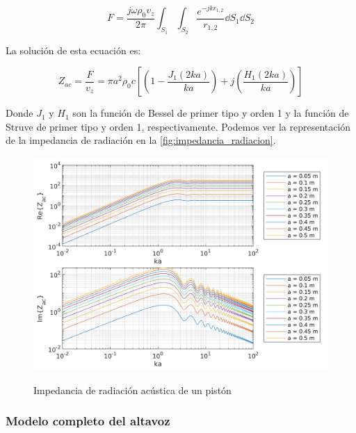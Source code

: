 \documentclass[12pt, a4paper]{article}
\begin{document}
\begin{equation} \label{eq:presion_de_2_sobre_1}
  F = \frac{j\omega \rho_0 v_z}{2\pi} \int_{S_1} \int_{S_2} \frac{e^{-jkr_{1,2}}}{r_{1,2}} \dd S_1 \dd S_2
\end{equation}

La solución de esta ecuación es:

\begin{equation} \label{eq:impedancia_piston}
  Z_{ac} = \frac{F}{v_z} = \pi a^2 \rho_0 c \left[ \left( 1 - \frac{J_1 (2ka)}{ka}  \right) + j \left( \frac{H_1 (2ka)}{ka} \right)\right]
\end{equation}

Donde $J_1$ y $H_1$ son la función de Bessel de primer tipo y orden 1 y la función de Struve de primer tipo y orden 1, respectivamente. Podemos ver la representación de la impedancia de radiación en la \autoref{fig:impedancia_radiacion}.

\begin{figure}[htp]
  \centering
  \caption{Impedancia de radiación acústica de un pistón}
  \includegraphics[width=\linewidth]{images/acoustic_radiation_impedance.png}
  \label{fig:impedancia_radiacion}
\end{figure}



\subsubsection{Modelo completo del altavoz}
\end{document}
